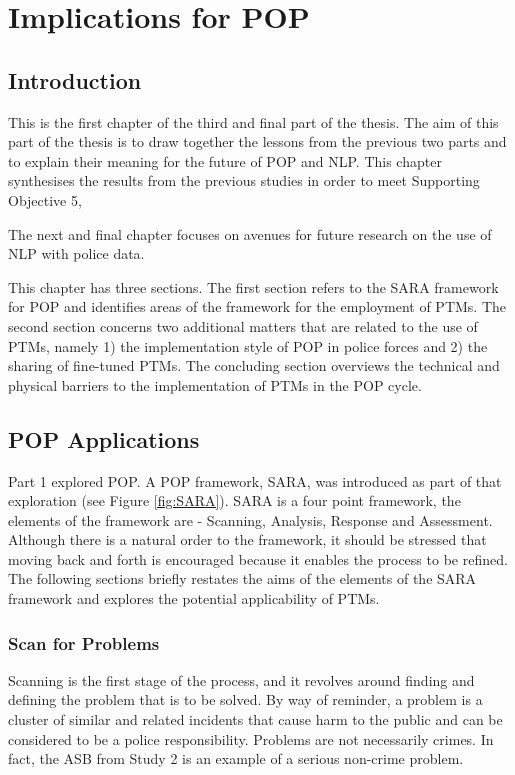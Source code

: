 \chapter{Implications for POP}


\section{Introduction} This is the first chapter of the third and final part of the thesis. The aim of this part of the thesis is to draw together the lessons from the previous two parts and to explain their meaning for the future of POP and NLP. This chapter synthesises the results from the previous studies in order to meet Supporting Objective 5,   

The next and final chapter focuses on avenues for future research on the use of NLP with police data.

This chapter has three sections. The first section refers to the SARA framework for POP and identifies areas of the framework for the employment of PTMs. The second section concerns two additional matters that are related to the use of PTMs, namely 1) the implementation style of POP in police  forces and 2) the sharing of fine-tuned PTMs. The concluding section overviews the technical and physical barriers to the implementation of PTMs in the POP cycle.


\section{POP Applications} Part 1 explored POP. A POP framework, SARA, was introduced as part of that exploration (see Figure \ref{fig:SARA}). SARA is a four point framework, the elements of the framework are - Scanning, Analysis, Response and Assessment.  Although there is a natural order to the framework, it should be stressed that moving back and forth is encouraged because it enables the process to be refined. The following sections briefly restates the aims of the elements of the SARA framework and explores the potential applicability of PTMs.

\subsection{Scan for Problems} Scanning is the first stage of the process, and it revolves around finding and defining the problem that is to be solved. By way of reminder, a problem is a cluster of similar and related incidents that cause harm to the public and can be considered to be a police responsibility. Problems are not necessarily crimes. In fact, the ASB from Study 2 is an example of a  serious non-crime  problem. 

